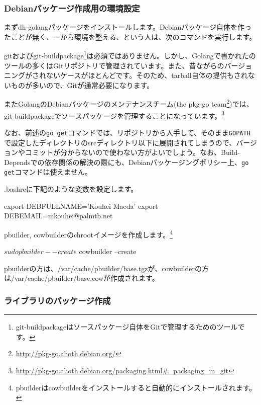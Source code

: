 \documentclass[mingoth,a4paper]{jsarticle}
\begin{document}
\subsubsection{Debianパッケージ作成用の環境設定}

まずdh-golangパッケージをインストールします。Debianパッケージ自体を作ったことが無く、一から環境を整える、という人は、次のコマンドを実行します。


gitおよびgit-buildpackage\footnote{git-buildpackageはソースパッケージ自体をGitで管理するためのツールです。}は必須ではありません。しかし、Golangで書かれたのツールの多くはGitリポジトリで管理されています。また、昔ながらのバージョニングがされないケースがほとんどです。そのため、tarball自体の提供もされないものが多いので、Gitが通常必要になります。

またGolangのDebianパッケージのメンテナンスチーム(the pkg-go team\footnote{\url{http://pkg-go.alioth.debian.org/}})では、git-buildpackageでソースパッケージを管理することになっています。\footnote{\url{http://pkg-go.alioth.debian.org/packaging.html\#_packaging_in_git}}

なお、前述の\texttt{go get}コマンドでは、リポジトリから入手して、そのまま\texttt{GOPATH}で設定したディレクトリのsrcディレクトリ以下に展開されてしまうので、バージョンやコミットが分からないので使わない方がよいでしょう。なお、Build-Dependsでの依存関係の解決の際にも、Debianパッケージングポリシー上、\texttt{go get}コマンドは使えません。

.bashrcに下記のような変数を設定します。
\begin{commandline}
export DEBFULLNAME='Kouhei Maeda'
export DEBEMAIL=mkouhei@palmtb.net
\end{commandline}

pbuilder, cowbuilderのchrootイメージを作成します。\footnote{pbuilderはcowbuilderをインストールすると自動的にインストールされます。}

\begin{commandline}
$ sudo pbuilder --create
$ cowbuilder --create
\end{commandline}
pbuilderの方は、/var/cache/pbuilder/base.tgzが、cowbuilderの方は/var/cache/pbuilder/base.cowが作成されます。

\subsubsection{ライブラリのパッケージ作成}
\end{document}
